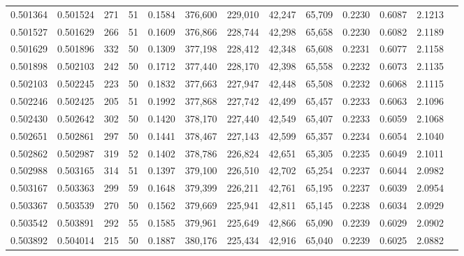 \begin{tabular}{rrrrrrrrrrrrr}
0.501364 & 0.501524 &   271 &  51 &                                     0.1584 & 376,600 & 229,010 &  42,247 &  65,709 & 0.2230 & 0.6087 & 2.1213 \\
0.501527 & 0.501629 &   266 &  51 &                                     0.1609 & 376,866 & 228,744 &  42,298 &  65,658 & 0.2230 & 0.6082 & 2.1189 \\
0.501629 & 0.501896 &   332 &  50 &                                     0.1309 & 377,198 & 228,412 &  42,348 &  65,608 & 0.2231 & 0.6077 & 2.1158 \\
0.501898 & 0.502103 &   242 &  50 &                                     0.1712 & 377,440 & 228,170 &  42,398 &  65,558 & 0.2232 & 0.6073 & 2.1135 \\
0.502103 & 0.502245 &   223 &  50 &                                     0.1832 & 377,663 & 227,947 &  42,448 &  65,508 & 0.2232 & 0.6068 & 2.1115 \\
0.502246 & 0.502425 &   205 &  51 &                                     0.1992 & 377,868 & 227,742 &  42,499 &  65,457 & 0.2233 & 0.6063 & 2.1096 \\
0.502430 & 0.502642 &   302 &  50 &                                     0.1420 & 378,170 & 227,440 &  42,549 &  65,407 & 0.2233 & 0.6059 & 2.1068 \\
0.502651 & 0.502861 &   297 &  50 &                                     0.1441 & 378,467 & 227,143 &  42,599 &  65,357 & 0.2234 & 0.6054 & 2.1040 \\
0.502862 & 0.502987 &   319 &  52 &                                     0.1402 & 378,786 & 226,824 &  42,651 &  65,305 & 0.2235 & 0.6049 & 2.1011 \\
0.502988 & 0.503165 &   314 &  51 &                                     0.1397 & 379,100 & 226,510 &  42,702 &  65,254 & 0.2237 & 0.6044 & 2.0982 \\
0.503167 & 0.503363 &   299 &  59 &                                     0.1648 & 379,399 & 226,211 &  42,761 &  65,195 & 0.2237 & 0.6039 & 2.0954 \\
0.503367 & 0.503539 &   270 &  50 &                                     0.1562 & 379,669 & 225,941 &  42,811 &  65,145 & 0.2238 & 0.6034 & 2.0929 \\
0.503542 & 0.503891 &   292 &  55 &                                     0.1585 & 379,961 & 225,649 &  42,866 &  65,090 & 0.2239 & 0.6029 & 2.0902 \\
0.503892 & 0.504014 &   215 &  50 &                                     0.1887 & 380,176 & 225,434 &  42,916 &  65,040 & 0.2239 & 0.6025 & 2.0882 \\

\end{tabular}
